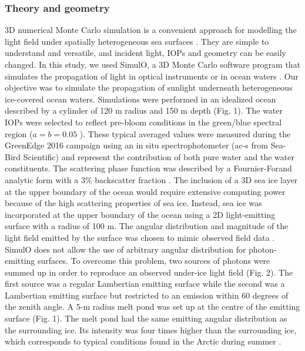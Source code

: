 \subsubsection{Theory and geometry}

3D numerical Monte Carlo simulation is a convenient approach for modelling the light field under spatially heterogeneous sea surfaces \citep{Mobley_ocean_optics_book, Petrich2012, Katlein2014, Katlein2016}. They are simple to understand and versatile, and incident light, IOPs and geometry can be easily changed. In this study, we used SimulO, a 3D Monte Carlo software program that simulates the propagation of light in optical instruments or in ocean waters \citep{Leymarie2010}. Our objective was to simulate the propagation of sunlight underneath heterogeneous ice-covered ocean waters. Simulations were performed in an idealized ocean described by a cylinder of 120 m radius and 150 m depth (Fig. 1). The water IOPs were selected to reflect pre-bloom conditions in the green/blue spectral region ($a = b = 0.05$ \mminus{}). These typical averaged values were measured during the GreenEdge 2016 campaign using an in situ spectrophotometer (ac-s from Sea-Bird Scientific) and represent the contribution of both pure water and the water constituents. The scattering phase function was described by a Fournier-Forand analytic form with a 3\% backscatter fraction \citep{Fournier1994, Mobley2002}. The inclusion of a 3D sea ice layer at the upper boundary of the ocean would require extensive computing power because of the high scattering properties of sea ice. Instead, sea ice was incorporated at the upper boundary of the ocean using a 2D light-emitting surface with a radius of 100 m. The angular distribution and magnitude of the light field emitted by the surface was chosen to mimic observed field data \citep{Girard2018}. SimulO does not allow the use of arbitrary angular distribution for photon-emitting surfaces. To overcome this problem, two sources of photons were summed up in order to reproduce an observed under-ice light field (Fig. 2). The first source was a regular Lambertian emitting surface while the second was a Lambertian emitting surface but restricted to an emission within 60 degrees of the zenith angle. A 5-m radius melt pond was set up at the centre of the emitting surface (Fig. 1). The melt pond had the same emitting angular distribution as the surrounding ice. Its intensity was four times higher than the surrounding ice, which corresponds to typical conditions found in the Arctic during summer \citep{Perovich2016}.

